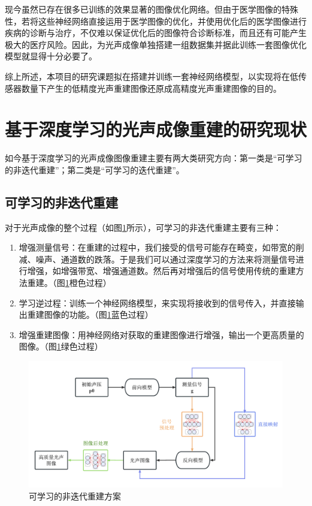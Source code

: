  现今虽然已存在很多已训练的效果显著的图像优化网络。但由于医学图像的特殊性，若将这些神经网络直接运用于医学图像的优化，并使用优化后的医学图像进行疾病的诊断与治疗，不仅难以保证优化后的图像符合诊断标准，而且还有可能产生极大的医疗风险。因此，为光声成像单独搭建一组数据集并据此训练一套图像优化模型就显得十分必要了。
 
 综上所述，本项目的研究课题拟在搭建并训练一套神经网络模型，以实现将在低传感器数量下产生的低精度光声重建图像还原成高精度光声重建图像的目的。
 
 \section{基于深度学习的光声成像重建的研究现状}
 如今基于深度学习的光声成像图像重建主要有两大类研究方向：第一类是“可学习的非迭代重建”；第二类是“可学习的迭代重建”。
 \subsection{可学习的非迭代重建}
 对于光声成像的整个过程（如图\ref{img104}所示），可学习的非迭代重建主要有三种：
 
\begin{enumerate}
 	\item 增强测量信号：在重建的过程中，我们接受的信号可能存在畸变，如带宽的削减、噪声、通道数的跌落。于是我们可以通过深度学习的方法来将测量信号进行增强，如增强带宽、增强通道数。然后再对增强后的信号使用传统的重建方法重建。（图\ref{img104}橙色过程）
 	\item 学习逆过程：训练一个神经网络模型，来实现将接收到的信号传入，并直接输出重建图像的功能。（图\ref{img104}蓝色过程）
 	\item 增强重建图像：用神经网络对获取的重建图像进行增强，输出一个更高质量的图像。（图\ref{img104}绿色过程）
\end{enumerate}

\begin{figure}[h]
	\centering
	\includegraphics[width=0.9\columnwidth]{image/chap01/img_1_04.png}
	\caption{可学习的非迭代重建方案}
	\label{img104}
\end{figure}

